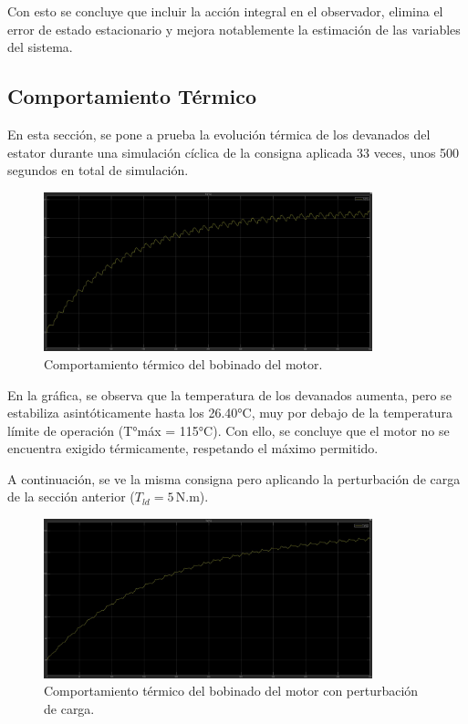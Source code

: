 \documentclass{article}
\begin{document}
Con esto se concluye que incluir la acci\'on integral en el observador, elimina el error de estado estacionario y mejora notablemente la estimaci\'on de las variables del sistema.




\subsection{Comportamiento Térmico}

En esta sección, se pone a prueba la evolución térmica de los devanados del estator durante una simulación cíclica de la consigna aplicada 33 veces, unos 500 segundos en total de simulación.

\begin{figure}[H]
    \centering
    \includegraphics[width=0.85\textwidth]{Imagenes/verificacion_temperatura.jpeg}
    \caption{Comportamiento térmico del bobinado del motor.}
    \label{fig:temperatura}
\end{figure}

En la gráfica, se observa que la temperatura de los devanados aumenta, pero se estabiliza asintóticamente hasta los 26.40°C, muy por debajo de la 
temperatura límite de operación (T°máx = 115°C). Con ello, se concluye que el motor no se encuentra exigido térmicamente, respetando el máximo permitido.

A continuación, se ve la misma consigna pero aplicando la perturbación de carga de la sección anterior (\(T_{ld} = 5\,\text{N.m}\)).

\begin{figure}[H]
    \centering
    \includegraphics[width=0.85\textwidth]{Imagenes/verificacion_temperatura_carga.jpeg}
    \caption{Comportamiento térmico del bobinado del motor con perturbación de carga.}
    \label{fig:temperatura}
\end{figure}
\end{document}
